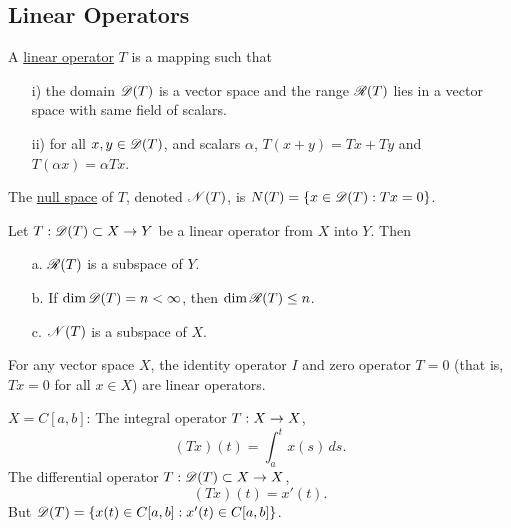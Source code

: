 \documentclass[]{article}
\begin{document}
\subsection*{Linear Operators}

\begin{definition}
	A \ul{linear operator} $T$ is a mapping such that
	\begin{enumerate}
		\item[i)] the domain $\mathscr{D}(T)$ is a vector space and the range $\mathscr{R}(T)$ lies in a vector space with same field of scalars.
		\item[ii)] for all $x,y\in \mathscr{D}(T)$, and scalars $\alpha$, $T(x+y) = Tx+Ty$ and $T(\alpha x) = \alpha Tx$.
	\end{enumerate}
\end{definition}
\begin{definition}
	The \ul{null space} of $T$, denoted $\mathscr{N}(T)$, is $N(T) = \left\{ x\in \mathscr{D}(T) : Tx=0 \right\}$.
\end{definition}
\begin{theorem}
	Let $T:\mathscr{D}(T)\subset X\rightarrow Y$ be a linear operator from $X$ into $Y$. Then
	\begin{enumerate}
		\item[a.] $\mathscr{R}(T)$ is a subspace of $Y$.
		\item[b.] If $\dim\mathscr{D}(T)=n<\infty$, then $\dim\mathscr{R}(T)\leq n$.
		\item[c.] $\mathscr{N}(T)$ is a subspace of $X$.
	\end{enumerate}
\end{theorem}
\begin{example}
	For any vector space $X$, the identity operator $I$ and zero operator $T=0$ (that is, $Tx=0$ for all $x\in X$) are linear operators.
\end{example}
\begin{example}
	$X=C[a,b]$: The integral operator $T:X\rightarrow X$,
	$$(Tx)(t) = \int_a^tx(s)\,ds.$$
	The differential operator $T:\mathscr{D}(T)\subset X\rightarrow X$,
	$$ (Tx)(t) = x'(t).$$
	But $\mathscr{D}(T) = \left\{ x(t)\in C[a,b] : x'(t)\in C[a,b] \right\}$.
\end{example}
\end{document}
